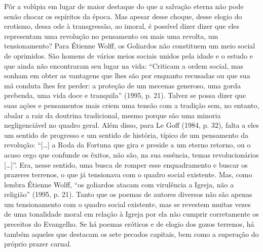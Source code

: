 Pôr a volúpia em lugar de maior destaque do que a salvação eterna não
pode senão chocar os espíritos da época. Mas apesar desse choque, desse
elogio do erotismo, dessa ode à transgressão, ao imoral, é possível dizer
dizer que eles representam uma revolução no pensamento ou mais uma
revolta, um tensionamento? Para Étienne Wolff, os Goliardos não constituem um
meio social de oprimidos. São homens de vários meios sociais unidos pela
idade e o estudo e que ainda não encontraram seu lugar na vida:
``Criticam a ordem social, mas sonham em obter as vantagens que lhes são
por enquanto recusadas ou que sua má conduta lhes fez perder: a proteção
de um mecenas generoso, uma gorda prebenda, uma vida doce e tranquila''
(1995, p. 21). Talvez se possa dizer que suas ações e pensamentos mais
criem uma tensão com a tradição sem, no entanto, abalar a raiz da
doutrina tradicional, mesmo porque são uma minoria negligenciável no
quadro geral. Além disso, para Le Goff (1984, p. 32), falta a eles um
sentido de progresso e um sentido de história, típico de um pensamento
da revolução: ``[\ldots{}] a Roda da Fortuna que gira e preside a um
eterno retorno, ou o acaso cego que confunde os êxitos, não são, na sua
essência, temas revolucionários [\ldots{}]''. Era, nesse sentido, uma
busca de romper esse enquadramento e buscar os prazeres terrenos, o que
já tensionava com o quadro social existente. Mas, como lembra Étienne
Wolff, ``os goliardos atacam com virulência a Igreja, não a religião''
(1995, p. 21). Tanto que os poemas de autores diversos não são apenas um
tensionamento com o quadro social existente, mas se revestem muitas
vezes de uma tonalidade moral em relação à Igreja por ela não cumprir
corretamente os preceitos do Evangelho. Se há poemas eróticos e de
elogio dos gozos terrenos, há também aqueles que destacam os sete
pecados capitais, bem como a superação do próprio prazer carnal.


